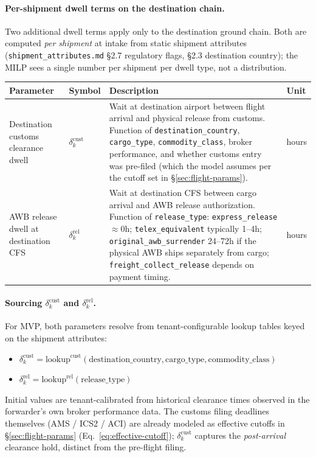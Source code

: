 \documentclass[11pt,a4paper]{article}
\theoremstyle{definition}
\begin{document}
\paragraph{Per-shipment dwell terms on the destination chain.}
Two additional dwell terms apply only to the destination ground chain. Both are computed
\emph{per shipment} at intake from static shipment attributes (\texttt{shipment\_attributes.md}
\S2.7 regulatory flags, \S2.3 destination country); the MILP sees a single number per
shipment per dwell type, not a distribution.

\begin{center}
\begin{tabular}{llp{6.5cm}l}
\toprule
Parameter & Symbol & Description & Unit \\
\midrule
Destination customs clearance dwell & $\delta^{\text{cust}}_k$ & Wait at destination airport between flight arrival and physical release from customs. Function of \texttt{destination\_country}, \texttt{cargo\_type}, \texttt{commodity\_class}, broker performance, and whether customs entry was pre-filed (which the model assumes per the cutoff set in \S\ref{sec:flight-params}). & hours \\
AWB release dwell at destination CFS & $\delta^{\text{rel}}_k$ & Wait at destination CFS between cargo arrival and AWB release authorization. Function of \texttt{release\_type}: \texttt{express\_release} $\approx 0$h; \texttt{telex\_equivalent} typically 1--4h; \texttt{original\_awb\_surrender} 24--72h if the physical AWB ships separately from cargo; \texttt{freight\_collect\_release} depends on payment timing. & hours \\
\bottomrule
\end{tabular}
\end{center}

\paragraph{Sourcing $\delta^{\text{cust}}_k$ and $\delta^{\text{rel}}_k$.}
For MVP, both parameters resolve from tenant-configurable lookup tables keyed on the
shipment attributes:
\begin{itemize}[noitemsep]
  \item $\delta^{\text{cust}}_k = \text{lookup}^{\text{cust}}(\text{destination\_country}, \text{cargo\_type}, \text{commodity\_class})$
  \item $\delta^{\text{rel}}_k = \text{lookup}^{\text{rel}}(\text{release\_type})$
\end{itemize}
Initial values are tenant-calibrated from historical clearance times observed in the
forwarder's own broker performance data. The customs filing deadlines themselves
(AMS / ICS2 / ACI) are already modeled as effective cutoffs in
\S\ref{sec:flight-params} (Eq.~\ref{eq:effective-cutoff}); $\delta^{\text{cust}}_k$
captures the \emph{post-arrival} clearance hold, distinct from the pre-flight filing.
\end{document}
